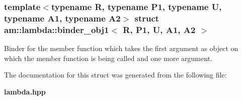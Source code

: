 \subsubsection*{template$<$typename R, typename P1, typename U, typename A1, typename A2$>$ struct am::lambda::binder\_\-obj1$<$ R, P1, U, A1, A2 $>$}

Binder for the member function which takes the first argument as object on which the member function is being called and one more argument. 



The documentation for this struct was generated from the following file:\begin{CompactItemize}
\item 
{\bf lambda.hpp}\end{CompactItemize}
